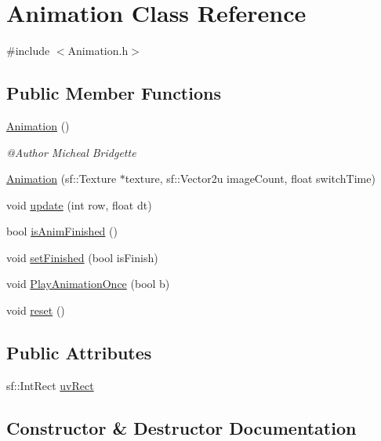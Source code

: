 \hypertarget{class_animation}{}\section{Animation Class Reference}
\label{class_animation}


{\ttfamily \#include $<$Animation.\+h$>$}

\subsection*{Public Member Functions}
\begin{DoxyCompactItemize}
\item 
\mbox{\hyperlink{class_animation_a83f0a16cef7117f187ad596de38dd9d6}{Animation}} ()
\begin{DoxyCompactList}\small\item\em @\+Author Micheal Bridgette \end{DoxyCompactList}\item 
\mbox{\hyperlink{class_animation_a6353d585c4a1aa26cfbc6ee24d314969}{Animation}} (sf\+::\+Texture $\ast$texture, sf\+::\+Vector2u image\+Count, float switch\+Time)
\item 
void \mbox{\hyperlink{class_animation_a9d7263191a35959fa56b074ff7b9450a}{update}} (int row, float dt)
\item 
bool \mbox{\hyperlink{class_animation_aa41a6d43bc5e56f73c07eb5998aba757}{is\+Anim\+Finished}} ()
\item 
void \mbox{\hyperlink{class_animation_ad9800ca0eaa9d3f811c81f01de8912d6}{set\+Finished}} (bool is\+Finish)
\item 
void \mbox{\hyperlink{class_animation_ad9fb857c59f02aaff307eff7be73203a}{Play\+Animation\+Once}} (bool b)
\item 
void \mbox{\hyperlink{class_animation_a903eb4b61b8c7bc72bbedbdba4cbb501}{reset}} ()
\end{DoxyCompactItemize}
\subsection*{Public Attributes}
\begin{DoxyCompactItemize}
\item 
sf\+::\+Int\+Rect \mbox{\hyperlink{class_animation_a82c41dd15d9a98ecc0699ecca09fd056}{uv\+Rect}}
\end{DoxyCompactItemize}


\subsection{Constructor \& Destructor Documentation}
\mbox{\label{class_animation_a83f0a16cef7117f187ad596de38dd9d6}} 

